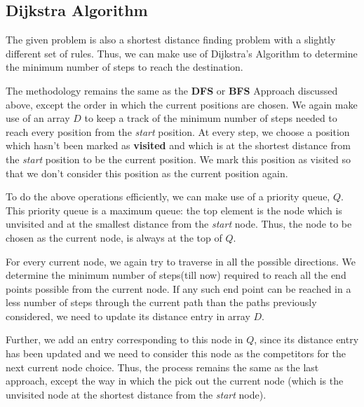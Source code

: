 \subsection{Dijkstra Algorithm}

The given problem is also a shortest distance finding problem with a slightly different set of rules. Thus, we can make use of Dijkstra's Algorithm to determine the minimum number of steps to reach the destination.

The methodology remains the same as the \textbf{DFS} or \textbf{BFS} Approach discussed above, except the order in which the current positions are chosen. We again make use of an array $D$ to keep a track of the minimum number of steps needed to reach every position from the \textit{start} position. At every step, we choose a position which hasn't been marked as \textbf{visited} and which is at the shortest distance from the \textit{start} position to be the current position. We mark this position as visited so that we don't consider this position as the current position again.

To do the above operations efficiently, we can make use of a priority queue, $Q$. This priority queue is a maximum queue: the top element is the node which is unvisited and at the smallest distance from the \textit{start} node. Thus, the node to be chosen as the current node, is always at the top of $Q$.

For every current node, we again try to traverse in all the possible directions. We determine the minimum number of steps(till now) required to reach all the end points possible from the current node. If any such end point can be reached in a less number of steps through the current path than the paths previously considered, we need to update its distance entry in array $D$.

Further, we add an entry corresponding to this node in $Q$, since its distance entry has been updated and we need to consider this node as the competitors for the next current node choice. Thus, the process remains the same as the last approach, except the way in which the pick out the current node (which is the unvisited node at the shortest distance from the \textit{start} node).

